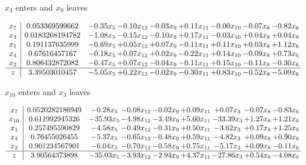 \documentclass[8pt]{article}
\begin{document}
 $ x_{3} $ enters and $ x_{9} $ leaves 

 \[\begin{array}{c| c c@{\hskip 2pt} c@{\hskip 2pt} c@{\hskip 2pt} c@{\hskip 2pt} c@{\hskip 2pt} c@{\hskip 2pt} c@{\hskip 2pt} }
 x_{7}   &  0.053369599662 & -0.35 x_{5} & -0.10 x_{12} & -0.03 x_{9} & +  0.11 x_{11} & -0.00 x_{10} & -0.07 x_{8} & -0.82 x_{6}\\
 x_{3}   &  0.0183268194782 & -1.08 x_{5} & -0.15 x_{12} & -0.10 x_{9} & +  0.17 x_{11} & -0.03 x_{10} & +  0.04 x_{8} & +  0.04 x_{6}\\
 x_{1}   &  0.191137635999 & -0.69 x_{5} & +  0.05 x_{12} & +  0.07 x_{9} & -0.11 x_{11} & +  0.11 x_{10} & +  0.03 x_{8} & +  1.12 x_{6}\\
 x_{4}   &  0.67616457167 & -0.18 x_{5} & +  0.07 x_{12} & +  0.02 x_{9} & -0.22 x_{11} & +  0.14 x_{10} & -0.09 x_{8} & +  0.73 x_{6}\\
 x_{2}   &  0.806432872082 & -0.47 x_{5} & +  0.07 x_{12} & -0.04 x_{9} & -0.11 x_{11} & +  0.15 x_{10} & -0.11 x_{8} & -0.30 x_{6}\\
\hline
z    &  3.39503010457 & -5.05 x_{5} & +  0.22 x_{12} & -0.02 x_{9} & -0.30 x_{11} & +  0.83 x_{10} & -0.52 x_{8} & -5.09 x_{6}\\
\end{array}\]


 $ x_{10} $ enters and $ x_{3} $ leaves 

 \[\begin{array}{c| c c@{\hskip 2pt} c@{\hskip 2pt} c@{\hskip 2pt} c@{\hskip 2pt} c@{\hskip 2pt} c@{\hskip 2pt} c@{\hskip 2pt} }
 x_{7}   &  0.0520282186949 & -0.28 x_{5} & -0.08 x_{12} & -0.02 x_{9} & +  0.09 x_{11} & +  0.07 x_{3} & -0.07 x_{8} & -0.83 x_{6}\\
 x_{10}   &  0.611992945326 & -35.93 x_{5} & -4.98 x_{12} & -3.49 x_{9} & +  5.60 x_{11} & -33.39 x_{3} & +  1.27 x_{8} & +  1.21 x_{6}\\
 x_{1}   &  0.257495590829 & -4.58 x_{5} & -0.49 x_{12} & -0.31 x_{9} & +  0.50 x_{11} & -3.62 x_{3} & +  0.17 x_{8} & +  1.25 x_{6}\\
 x_{4}   &  0.76455026455 & -5.37 x_{5} & -0.65 x_{12} & -0.48 x_{9} & +  0.59 x_{11} & -4.82 x_{3} & +  0.09 x_{8} & +  0.90 x_{6}\\
 x_{2}   &  0.901234567901 & -6.04 x_{5} & -0.70 x_{12} & -0.58 x_{9} & +  0.75 x_{11} & -5.17 x_{3} & +  0.09 x_{8} & -0.11 x_{6}\\
\hline
z    &  3.90564373898 & -35.03 x_{5} & -3.93 x_{12} & -2.94 x_{9} & +  4.37 x_{11} & -27.86 x_{3} & +  0.54 x_{8} & -4.08 x_{6}\\
\end{array}\]
\end{document}
